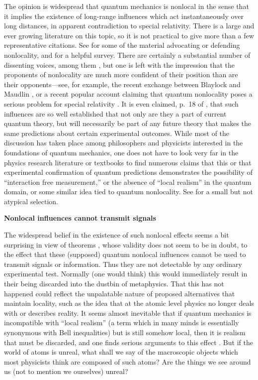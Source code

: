 \documentclass[10pt]{article} %
\def\outl#1{\par{\medskip\noindent\hspace*{.5cm}\bf
      \mathversion{bold}#1\mathversion{normal}\smallskip} }
\def\np{} \def\xa{} \def\xb{} \def\xn{} \def\xp{}
\def\outl#1{} \def\np{} \def\xa{} \def\xb{} \def\xn{} \def\xp{}
\def\outl#1{\par{\medskip\noindent\hspace*{.5cm}\bf
      \mathversion{bold}#1\mathversion{normal}\smallskip} }
\def\np{\newpage }\def\xn{\nopagebreak }\def\xp{\pagebreak }
\begin{document}
The opinion is widespread that quantum mechanics is nonlocal in the sense that
it implies the existence of long-range influences which act instantaneously
over long distances, in apparent contradiction to special relativity.  There
is a large and ever growing literature on this topic, so it is not practical
to give more than a few representative citations. See
%
\cite{Bll81,HyRd83,Bll90b,Albr92,PpRh94,Pty95,Glds96,SrSc97,Mdln02,Shmn04,%
ElDl05,dEsp06,Nrsn06,Shmn07,Ldsa08}
%
for some of the material advocating or defending nonlocality, and
\cite{Brkv07} for a helpful survey. There are certainly a substantial number
of dissenting voices, among them %
\cite{Fne82,Fne89,dMyn86,dMao94,dMyn02,Mrmn99,SmRv07,BrZk10}, 
%
but one is left with the impression that the proponents of nonlocality are
much more confident of their position than are their opponents---see, for
example, the recent exchange between Blaylock \cite{Blyl10} and Maudlin
\cite{Mdln10}, or a recent popular account claiming that quantum nonlocality
poses a serious problem for special relativity \cite{AlGl09}.  It is even
claimed, p.~18 of \cite{dEsp06}, that such influences are so well established
that not only are they a part of current quantum theory, but will necessarily
be part of any future theory that makes the same predictions about certain
experimental outcomes. While most of the discussion has taken place among
philosophers and physicists interested in the foundations of quantum
mechanics, one does not have to look very far in the physics research
literature or textbooks to find numerous claims that this or that experimental
confirmation of quantum predictions demonstrates the possibility of
``interaction free measurement,'' or the absence of ``local realism'' in the
quantum domain, or some similar idea tied to quantum nonlocality. See
%
\cite{DGao97,Kwao99,BnCS04s,WARZ05,DGrf05b,Ynao06,Grao07,MlLl08}
%
for a small but not atypical selection.

\xb
\outl{Nonlocal influences cannot transmit signals}
\xa

The widespread belief in the existence of such nonlocal effects seems a bit
surprising in view of theorems \cite{GhRW80,Brao00}, whose validity does not
seem to be in doubt, to the effect that these (supposed) quantum nonlocal
influences cannot be used to transmit signals or information. Thus they are
not detectable by any ordinary experimental test.  Normally (one would think)
this would immediately result in their being discarded into the dustbin of
metaphysics.  That this has not happened could reflect the unpalatable nature
of proposed alternatives that maintain locality, such as the idea that at the
atomic level physics no longer deals with or describes reality.  It seems
almost inevitable that if quantum mechanics is incompatible with ``local
realism'' (a term which in many minds is essentially synonymous with Bell
inequalities) but is still somehow local, then it is realism that must be
discarded, and one finds serious arguments to this effect \cite{CvFS07}.  But
if the world of atoms is unreal, what shall we say of the macroscopic objects
which most physicists think are composed of such atoms?  Are the things we see
around us (not to mention we ourselves) unreal?
\end{document}
